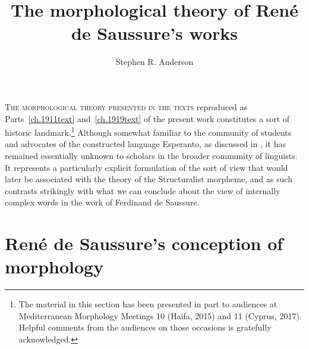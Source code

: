 \documentclass[output=paper]{langsci/langscibook}
\author{Stephen R. Anderson\affiliation{Yale University}}
\title{The morphological theory of René de Saussure's works}
\begin{document}
\label{sec:morph-theory}
\lettrine[loversize=0.1, nindent=0em] {T}{he morphological theory presented in the texts} 
reproduced as Parts~\ref{ch.1911text} and~\ref{ch.1919text} 
of the present work constitutes a sort of historic
landmark.\footnote{The material in this section has been presented in
  part to audiences at Mediterranean Morphology Meetings 10 (Haifa,
  2015) and 11 (Cyprus, 2017). Helpful comments from the audiences on
  those occasions is gratefully acknowledged.}  Although somewhat
familiar to the community of students and advocates of the construc\-ted
language Esperanto, as discussed in , it
has remained essentially unknown to scholars in the broader community
of linguists. It represents a particularly explicit formulation of the
sort of view that would later be associated with the theory of the
Structuralist morpheme, and as such contrasts strikingly with what we
can conclude about the view of internally complex words in the work of
Ferdinand de Saussure.

\section{René de Saussure's conception of morphology}
\label{sec:basic-principles}
\end{document}
